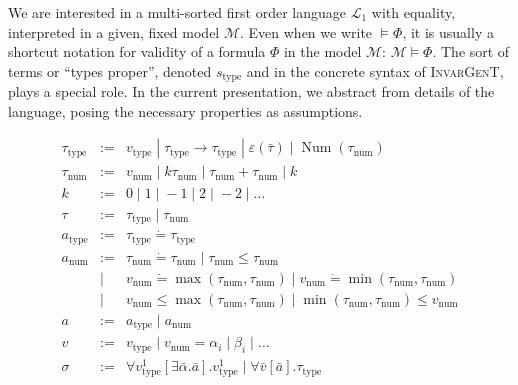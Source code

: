 \documentclass{article}
\newcommand{\assign}{:=}
\newcommand{\tmname}[1]{\textsc{#1}}
\newcommand{\tmop}[1]{\ensuremath{\operatorname{#1}}}
\newcommand{\tmverbatim}[1]{{\ttfamily{#1}}}
\begin{document}
We are interested in a multi-sorted first order language $\mathcal{L}_1$ with
equality, interpreted in a given, fixed model $\mathcal{M}$. Even when we
write $\vDash \Phi$, it is usually a shortcut notation for validity of a
formula $\Phi$ in the model $\mathcal{M}$: $\mathcal{M} \vDash \Phi$. The sort
of terms or ``types proper'', denoted $s_{\tmop{type}}$ and \tmverbatim{type}
in the concrete syntax of {\tmname{InvarGenT}}, plays a special role. In the
current presentation, we abstract from details of the language, posing the
necessary properties as assumptions.\begin{table}[t]
  \[ \begin{array}{lll}
       \tau_{\tmop{type}} & \assign & v_{\tmop{type}} \; | \;
       \tau_{\tmop{type}} \rightarrow \tau_{\tmop{type}} \; | \; \varepsilon
       (\bar{\tau}) \; | \; \tmop{Num} (\tau_{\tmop{num}})\\
       \tau_{\tmop{num}} & \assign & v_{\tmop{num}} \; | \; k
       \tau_{\tmop{num}} \; | \; \tau_{\tmop{num}} + \tau_{\tmop{num}} \; | \;
       k\\
       k & \assign & 0 \; | \; 1 \; | \; - 1 \; | \; 2 \; | \; - 2 \; | \;
       \ldots\\
       \tau & \assign & \tau_{\tmop{type}} \; | \; \tau_{\tmop{num}}\\
       a_{\tmop{type}} & \assign & \tau_{\tmop{type}} \dot{=}
       \tau_{\tmop{type}}\\
       a_{\tmop{num}} & \assign & \tau_{\tmop{num}} \dot{=} \tau_{\tmop{num}}
       \; | \; \tau_{\tmop{num}} \leq \tau_{\tmop{num}}\\
       & | & v_{\tmop{num}} \dot{=} \max (\tau_{\tmop{num}},
       \tau_{\tmop{num}}) \; | \; v_{\tmop{num}} \dot{=} \min
       (\tau_{\tmop{num}}, \tau_{\tmop{num}})\\
       & | & v_{\tmop{num}} \leq \max (\tau_{\tmop{num}}, \tau_{\tmop{num}})
       \; | \; \min (\tau_{\tmop{num}}, \tau_{\tmop{num}}) \leq
       v_{\tmop{num}}\\
       a & \assign & a_{\tmop{type}} \; | \; a_{\tmop{num}}\\
       v & \assign & v_{\tmop{type}} \; | \; v_{\tmop{num}} = \alpha_i \; | \;
       \beta_i \; | \; \ldots\\
       \sigma & \assign & \forall v_{\tmop{type}}^1 [\exists \bar{\alpha} .
       \bar{a}] .v_{\tmop{type}}^1 \; | \; \forall \bar{v} [\bar{a}] .
       \tau_{\tmop{type}}
     \end{array} \]
  \label{TypeSyn}
  \caption{Abstract syntax of types and type schemes}
\end{table}
\end{document}
